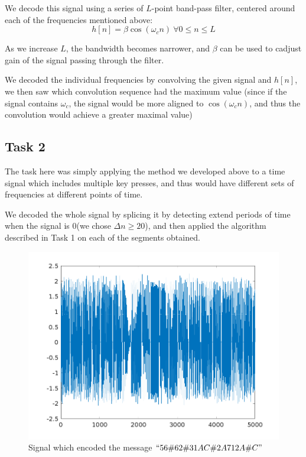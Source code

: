 \documentclass{article}
\begin{document}
We decode this signal using a series of $L$-point band-pass filter, centered around each of the frequencies mentioned above: 
\begin{equation}
  h[n]=\beta \cos(\omega_c n)\ \forall 0 \leq n \leq L
\end{equation}

As we increase $L$, the bandwidth becomes narrower, and $\beta$ can be used to cadjust gain of the signal passing through the filter. 

We decoded the individual frequencies by convolving the given signal and $h[n]$, we then saw which convolution sequence had the maximum value (since if the signal contains $\omega_c$, the signal would be more aligned to $\cos(\omega_c n)$, and thus the convolution would achieve a greater maximal value)

\subsection{Task 2}
The task here was simply applying the method we developed above to a time signal which includes multiple key presses, and thus would have different sets of frequencies at different points of time.

We decoded the whole signal by splicing it by detecting extend periods of time when the signal is 0(we chose $\Delta n\geq 20$), and then applied the algorithm described in Task 1 on each of the segments obtained. 

\begin{figure}[!ht]
\includegraphics[width=\textwidth]{signal_for_message.png}
\caption{Signal which encoded the message $``56\#62\#31AC\#2A712\*A\#C"$}
\label{fig:signal}
\end{figure}
\clearpage
\end{document}
